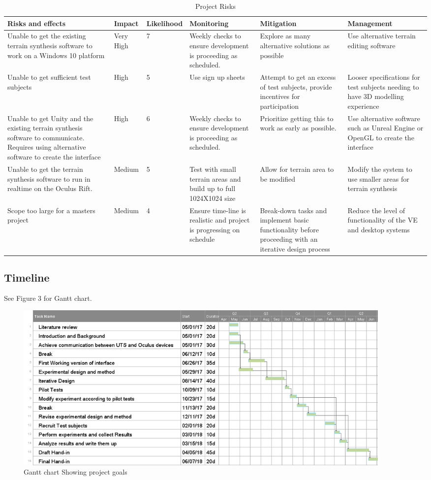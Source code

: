 \documentclass{sig-alternate-05-2015}
\begin{document}
\begin{table}[t]
	\centering
	\begin{tabular}{m{4cm} |m{1.75cm} |m{1.5cm} |m{3cm} |m{3cm} |m{3cm} }
		Risks and effects & Impact & Likelihood & Monitoring & Mitigation & Management \\ \hline
		Unable to get the existing terrain synthesis software to work on a Windows 10 platform & Very High & 7 & Weekly checks to ensure development is proceeding as scheduled. & Explore as many alternative solutions as possible & Use alternative terrain editing software\\ \hline
		Unable to get sufficient test subjects&
		High&
		5&
		Use sign up sheets&
		Attempt to get an excess of test subjects, provide incentives for participation&
		Looser specifications for test subjects needing to have 3D modelling experience\\ \hline
		Unable to get Unity and the existing terrain synthesis software to communicate. Requires using alternative software to create the interface & High & 6 & Weekly checks to ensure development is proceeding as scheduled. & Prioritize getting this to work as early as possible. & Use alternative software such as Unreal Engine or OpenGL to create the interface\\ \hline
		Unable to get the terrain synthesis software to run in realtime on the Oculus Rift. &
		Medium&
		5&
		Test with small terrain areas and build up to full 1024X1024 size&
		Allow for terrain area to be modified&
		Modify the system to use smaller areas for terrain synthesis\\ \hline
		Scope too large for a masters project&
		Medium&
		4&
		Ensure time-line is realistic and project is progressing on schedule&
		Break-down tasks and implement basic functionality before proceeding with an iterative design process&
		Reduce the level of functionality of the VE and desktop systems
	\end{tabular}
	\caption{Project Risks}
\end{table}
\newpage
\subsection{Timeline}
See Figure 3 for Gantt chart.
\begin{figure}[t]
	\includegraphics[width=540pt]{Gantt}
	\caption{Gantt chart Showing project goals}
\end{figure}
\end{document}
